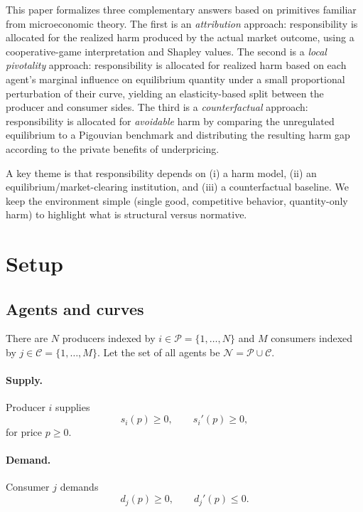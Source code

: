 \documentclass[journal, a4paper]{IEEEtran}
\begin{document}
This paper formalizes three complementary answers based on primitives familiar from microeconomic theory. The first is an \emph{attribution} approach: responsibility is allocated for the realized harm produced by the actual market outcome, using a cooperative-game interpretation and Shapley values. The second is a \emph{local pivotality} approach: responsibility is allocated for realized harm based on each agent's marginal influence on equilibrium quantity under a small proportional perturbation of their curve, yielding an elasticity-based split between the producer and consumer sides. The third is a \emph{counterfactual} approach: responsibility is allocated for \emph{avoidable} harm by comparing the unregulated equilibrium to a Pigouvian benchmark and distributing the resulting harm gap according to the private benefits of underpricing.

A key theme is that responsibility depends on (i) a harm model, (ii) an equilibrium/market-clearing institution, and (iii) a counterfactual baseline. We keep the environment simple (single good, competitive behavior, quantity-only harm) to highlight what is structural versus normative.

\section{Setup}
\subsection{Agents and curves}
There are $N$ producers indexed by $i\in \mathcal{P}=\{1,\dots,N\}$ and $M$ consumers indexed by $j\in \mathcal{C}=\{1,\dots,M\}$. Let the set of all agents be $\mathcal{N}=\mathcal{P}\cup \mathcal{C}$.

\paragraph{Supply.}
Producer $i$ supplies
\begin{equation}
s_i(p)\ge 0,\qquad s_i'(p)\ge 0,
\end{equation}
for price $p\ge 0$.

\paragraph{Demand.}
Consumer $j$ demands
\begin{equation}
d_j(p)\ge 0,\qquad d_j'(p)\le 0.
\end{equation}
\end{document}
